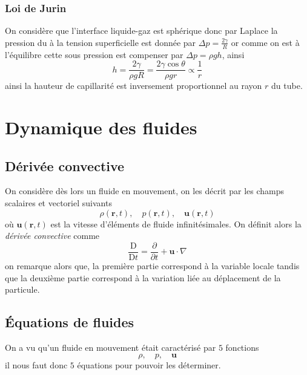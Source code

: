 \documentclass[10pt]{article}
\numberwithin{equation}{section}
\begin{document}
\subsubsection{Loi de Jurin}
On considère que l'interface liquide-gaz est sphérique donc par Laplace la pression du à la tension superficielle est donnée par $\Delta p = \frac{2\gamma}{R}$ or comme on est à l'équilibre cette sous pression est compenser par $\Delta p = \rho g h$, ainsi 
\[
\boxed{h = \frac{2 \gamma}{\rho g R} = \frac{2 \gamma \cos \theta}{\rho g r} \propto \frac1r}
\]
ainsi la hauteur de capillarité est inversement proportionnel au rayon $r$ du tube.

\clearpage
\section{Dynamique des fluides}

\subsection{Dérivée convective}
On considère dès lors un fluide en mouvement, on les décrit par les champs scalaires et vectoriel suivants
\[
\rho(\bm r, t), \quad p(\bm r, t) , \quad \bm u(\bm r, t)
\]
où $\bm u(\bm r, t)$ est la vitesse d'éléments de fluide infinitésimales. On définit alors la \emph{dérivée convective} comme 
\[
\boxed{\frac{\mathrm D}{\mathrm Dt} = \frac{\partial }{\partial t} + \bm  u \cdot \nabla}
\]
on remarque alors que, la première partie correspond à la variable locale tandis que la deuxième partie correspond à la variation liée au déplacement de la particule.

\subsection{Équations de fluides}
On a vu qu'un fluide en mouvement était caractérisé par $5$ fonctions
\[
\rho, \quad p , \quad \bm u
\]
il nous faut donc $5$ équations pour pouvoir les déterminer.
\end{document}
